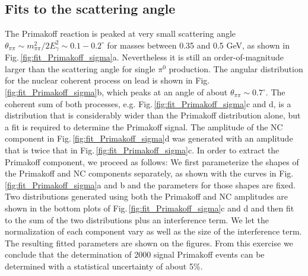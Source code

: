 \subsection{Fits to the scattering angle}
The Primakoff reaction is peaked at very small scattering angle $\theta_{\pi\pi} \sim m_{\pi\pi}^2 / 2E_\gamma^2 \sim 0.1-0.2^\circ$ for masses between 0.35 and 0.5 GeV, as shown in 
Fig.\,\ref{fig:fit_Primakoff_sigma}a.  Nevertheless it is still an
order-of-magnitude larger than the scattering angle for single $\pi^0$ production. The angular distribution for the nuclear coherent process on lead is shown in Fig.\,\ref{fig:fit_Primakoff_sigma}b, which 
peaks at an angle of about $\theta_{\pi\pi} \sim 0.7^\circ$. The coherent sum of both processes, e.g. Fig.\,\ref{fig:fit_Primakoff_sigma}c and d, is a distribution that is considerably wider than the 
Primakoff distribution alone, but a fit is required to determine the Primakoff signal. The amplitude of the NC component in Fig.\,\ref{fig:fit_Primakoff_sigma}d was generated with an amplitude that
is twice that in Fig.\,\ref{fig:fit_Primakoff_sigma}c.  In order to extract the Primakoff component, we proceed as follows: We first parameterize the shapes of the Primakoff and
NC components separately, as shown with the curves in Fig.\,\ref{fig:fit_Primakoff_sigma}a and b and the parameters for those shapes are fixed. Two distributions generated using both the Primakoff and
NC amplitudes are shown in the bottom plots of Fig.\,\ref{fig:fit_Primakoff_sigma}c and d and then fit to the sum of the two distributions plus an interference term. We let the normalization of each
component vary as well as the size of the interference term. The resulting fitted parameters are shown on the figures. From this exercise we conclude that the determination of 2000 signal Primakoff 
events can be determined with a statistical uncertainty of about 5\%. 

